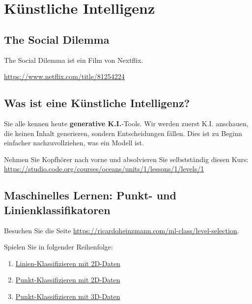 \documentclass[
  nswissgerman,
  a4paper,
  DIV=11,
  numbers=noendperiod,
  ngerman]{scrreprt}
\providecommand{\tightlist}{%
  \setlength{\itemsep}{0pt}\setlength{\parskip}{0pt}}
\begin{document}
\part{Künstliche Intelligenz}

\chapter{The Social Dilemma}\label{the-social-dilemma}

The Social Dilemma ist ein Film von Nextflix.

\url{https://www.netflix.com/title/81254224}

\chapter{Was ist eine Künstliche
Intelligenz?}\label{was-ist-eine-kuxfcnstliche-intelligenz}

Sie alle kennen heute \textbf{generative K.I.}-Tools. Wir werden zuerst
K.I. anschauen, die keinen Inhalt generieren, sondern Entscheidungen
fällen. Dies ist zu Beginn einfacher nachzuvollziehen, was ein Modell
ist.

Nehmen Sie Kopfhörer nach vorne und absolvieren Sie selbstständig diesen
Kurs:
\url{https://studio.code.org/courses/oceans/units/1/lessons/1/levels/1}

\chapter{Maschinelles Lernen: Punkt- und
Linienklassifikatoren}\label{maschinelles-lernen-punkt--und-linienklassifikatoren}

Besuchen Sie die Seite
\url{https://ricardoheinzmann.com/ml-class/level-selection}.

Spielen Sie in folgender Reihenfolge:

\begin{enumerate}
\def\labelenumi{\arabic{enumi}.}
\tightlist
\item
  \href{https://ricardoheinzmann.com/ml-class/level/linien-klassifizieren-2D}{Linien-Klassifizieren
  mit 2D-Daten}
\item
  \href{https://ricardoheinzmann.com/ml-class/level/punkt-klassifizieren-2D}{Punkt-Klassifizieren
  mit 2D-Daten}
\item
  \href{https://ricardoheinzmann.com/ml-class/level/punkt-klassifizieren-3D}{Punkt-Klassifizieren
  mit 3D-Daten}
\end{enumerate}
\end{document}
